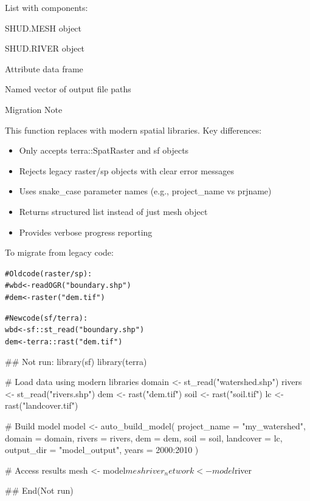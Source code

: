 \documentclass[a4paper]{book}
\begin{document}
%
\begin{Value}
List with components:
\begin{ldescription}
\item[\code{mesh}] SHUD.MESH object
\item[\code{river}] SHUD.RIVER object
\item[\code{attributes}] Attribute data frame
\item[\code{files}] Named vector of output file paths
\end{ldescription}
\end{Value}
%
\begin{Section}{Migration Note}

This function replaces  with modern spatial libraries.
Key differences:
\begin{itemize}

\item{} Only accepts terra::SpatRaster and sf objects
\item{} Rejects legacy raster/sp objects with clear error messages
\item{} Uses snake\_case parameter names (e.g., project\_name vs prjname)
\item{} Returns structured list instead of just mesh object
\item{} Provides verbose progress reporting

\end{itemize}


To migrate from legacy code:
\begin{alltt}
# Old code (raster/sp):
# wbd <- readOGR("boundary.shp")
# dem <- raster("dem.tif")

# New code (sf/terra):
wbd <- sf::st_read("boundary.shp")
dem <- terra::rast("dem.tif")
\end{alltt}

\end{Section}
%
\begin{Examples}
\begin{ExampleCode}
## Not run: 
library(sf)
library(terra)

# Load data using modern libraries
domain <- st_read("watershed.shp")
rivers <- st_read("rivers.shp")
dem <- rast("dem.tif")
soil <- rast("soil.tif")
lc <- rast("landcover.tif")

# Build model
model <- auto_build_model(
  project_name = "my_watershed",
  domain = domain,
  rivers = rivers,
  dem = dem,
  soil = soil,
  landcover = lc,
  output_dir = "model_output",
  years = 2000:2010
)

# Access results
mesh <- model$mesh
river_network <- model$river

## End(Not run)
\end{ExampleCode}
\end{Examples}
\end{document}

